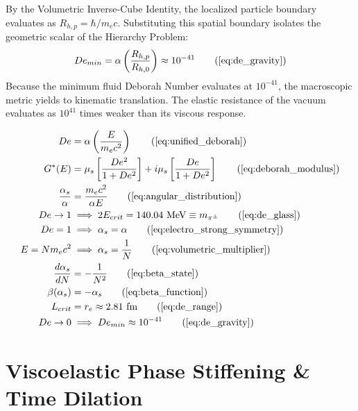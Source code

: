\documentclass[11pt, a4paper]{article}
\begin{document}
By the Volumetric Inverse-Cube Identity, the localized particle boundary evaluates as $R_{h,p} = \hbar / m_e c$. Substituting this spatial boundary isolates the geometric scalar of the Hierarchy Problem:
\begin{equation}
    De_{min} = \alpha \left( \frac{R_{h,p}}{R_{h,0}} \right) \approx 10^{-41} \tag{\ref{eq:de_gravity}}
\end{equation}
Because the minimum fluid Deborah Number evaluates at $10^{-41}$, the macroscopic metric yields to kinematic translation. The elastic resistance of the vacuum evaluates as $10^{41}$ times weaker than its viscous response.

\begin{tcolorbox}[recallbox, title={\ref{box:unified_deborah}. The Unified Cosmological Deborah Number}]
\begin{align}
    De &= \alpha \left( \frac{E}{m_e c^2} \right) \tag{\ref{eq:unified_deborah}} \\
    G^*(E) &= \mu_s \left[ \frac{De^2}{1 + De^2} \right] + i \mu_s \left[ \frac{De}{1 + De^2} \right] \tag{\ref{eq:deborah_modulus}} \\
    \frac{\alpha_s}{\alpha} &= \frac{m_e c^2}{\alpha E} \tag{\ref{eq:angular_distribution}} \\
    De \to 1 &\implies 2 E_{crit} = 140.04 \text{ MeV} \equiv m_{\pi^{\pm}} \tag{\ref{eq:de_glass}} \\
    De = 1 &\implies \alpha_s = \alpha \tag{\ref{eq:electro_strong_symmetry}} \\
    E = N m_e c^2 &\implies \alpha_s = \frac{1}{N} \tag{\ref{eq:volumetric_multiplier}} \\
    \frac{d\alpha_s}{dN} &= - \frac{1}{N^2} \tag{\ref{eq:beta_state}} \\
    \beta(\alpha_s) &= - \alpha_s \tag{\ref{eq:beta_function}} \\
    L_{crit} &= r_e \approx 2.81 \text{ fm} \tag{\ref{eq:de_range}} \\
    De \to 0 &\implies De_{min} \approx 10^{-41} \tag{\ref{eq:de_gravity}}
\end{align}
\end{tcolorbox}




\section{Viscoelastic Phase Stiffening \& Time Dilation}
\label{sec:deriv_viscoelastic_stiffening}
\end{document}
